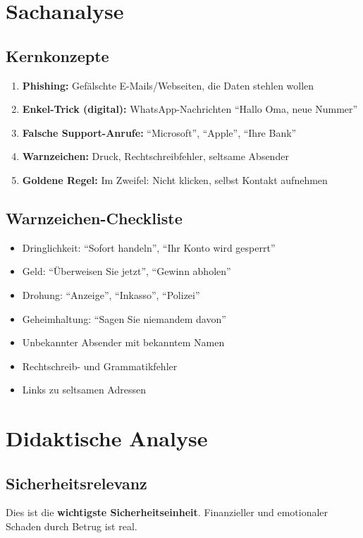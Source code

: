 \documentclass[11pt,a4paper]{article}
\begin{document}
\section{Sachanalyse}

\subsection{Kernkonzepte}
\begin{enumerate}
    \item \textbf{Phishing:} Gefälschte E-Mails/Webseiten, die Daten stehlen wollen
    \item \textbf{Enkel-Trick (digital):} WhatsApp-Nachrichten ``Hallo Oma, neue Nummer''
    \item \textbf{Falsche Support-Anrufe:} ``Microsoft'', ``Apple'', ``Ihre Bank''
    \item \textbf{Warnzeichen:} Druck, Rechtschreibfehler, seltsame Absender
    \item \textbf{Goldene Regel:} Im Zweifel: Nicht klicken, selbst Kontakt aufnehmen
\end{enumerate}

\subsection{Warnzeichen-Checkliste}
\begin{warnbox}
\begin{itemize}
    \item Dringlichkeit: ``Sofort handeln'', ``Ihr Konto wird gesperrt''
    \item Geld: ``Überweisen Sie jetzt'', ``Gewinn abholen''
    \item Drohung: ``Anzeige'', ``Inkasso'', ``Polizei''
    \item Geheimhaltung: ``Sagen Sie niemandem davon''
    \item Unbekannter Absender mit bekanntem Namen
    \item Rechtschreib- und Grammatikfehler
    \item Links zu seltsamen Adressen
\end{itemize}
\end{warnbox}

\section{Didaktische Analyse}

\subsection{Sicherheitsrelevanz}
Dies ist die \textbf{wichtigste Sicherheitseinheit}. Finanzieller und emotionaler Schaden durch Betrug ist real.
\end{document}
